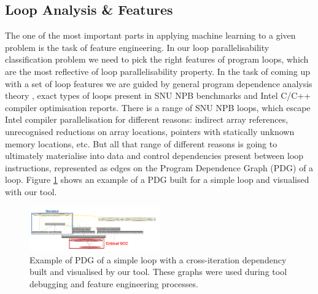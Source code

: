 \documentclass[sigconf,10pt,review,anonymous]{acmart}
\begin{document}
\subsection{Loop Analysis \& Features}
\label{loop_analysis_and_features}
\quad The one of the most important parts in applying machine learning to a given problem is the task of feature engineering. In our loop parallelisability classification problem we need to pick the right features of program loops, which are the most reflective of loop parallelisability property. In the task of coming up with a set of loop features we are guided by general program dependence analysis theory \cite{Kennedy:2001:OCM:502981}, exact types of loops present in SNU NPB benchmarks and Intel C/C++ compiler optimisation reports.\newline\null
\quad There is a range of SNU NPB loops, which escape Intel compiler parallelisation for different reasons: indirect array references, unrecognised reductions on array locations, pointers with statically unknown memory locations, etc. But all that range of different reasons is going to ultimately materialise into data and control dependencies present between loop instructions, represented as edges on the Program Dependence Graph (PDG) \cite{Ferrante:1987:PDG:24039.24041} of a loop. Figure \ref{fig:pdg} shows an example of a PDG built for a simple loop and visualised with our tool.\newline\null

\begin{figure}[h]
\includegraphics[width=0.5\textwidth]{figures/pdg_example.pdf}
\caption{Example of PDG of a simple loop with a cross-iteration dependency built and visualised by our tool. These graphs were used during tool debugging and feature engineering processes.}
\label{fig:pdg}
\end{figure}
\end{document}
